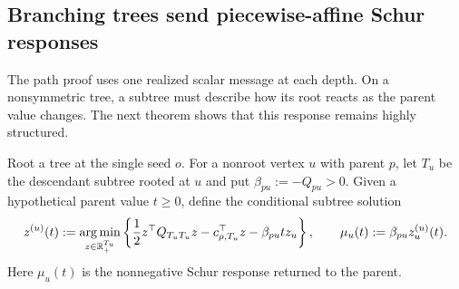 \subsection{Branching trees send piecewise-affine Schur responses}
\label{subsec:tree-response}

The path proof uses one realized scalar message at each depth.  On a
nonsymmetric tree, a subtree must describe how its root reacts as the parent
value changes.  The next theorem shows that this response remains highly
structured.

Root a tree at the single seed $o$.  For a nonroot vertex $u$ with parent
$p$, let $T_u$ be the descendant subtree rooted at $u$ and put
$\beta_{pu}:=-Q_{pu}>0$.  Given a hypothetical parent value $t\geq0$, define
the conditional subtree solution
\begin{equation}
 z^{(u)}(t)
 :=\operatorname*{arg\,min}_{z\in\mathbb R_+^{T_u}}
 \left\{
  \frac12 z^\top Q_{T_uT_u}z-c_{\rho,T_u}^\top z
  -\beta_{pu}t z_u
 \right\},
 \qquad
 \mu_u(t):=\beta_{pu}z_u^{(u)}(t).
 \label{eq:conditional-subtree-response}
\end{equation}
Here $\mu_u(t)$ is the nonnegative Schur response returned to the parent.

